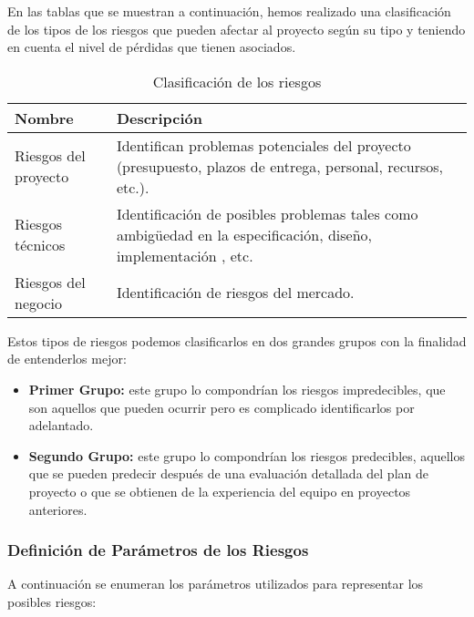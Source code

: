 \par En las tablas que se muestran a continuación, hemos realizado una clasificación de los tipos de los riesgos que pueden afectar al proyecto según su tipo y teniendo en cuenta el nivel de pérdidas que tienen asociados.

\begin{table}[H]
\begin{center}
\begin{tabular}{p{} p{11cm}}
\textbf{Nombre} & \textbf{Descripción}  \\ \hline
Riesgos del proyecto & Identifican problemas potenciales del proyecto (presupuesto, plazos de entrega, personal, recursos, etc.).\\
Riesgos técnicos &  Identificación de posibles problemas tales como ambigüedad en la especificación, diseño, implementación , etc.\\
Riesgos del negocio &  Identificación de riesgos del mercado. \\ \hline
\end{tabular}
\caption{Clasificación de los riesgos}
\label{clasificacionRiesgos}
\end{center}
\end{table}

\par Estos tipos de riesgos podemos clasificarlos en dos grandes grupos con la finalidad de entenderlos mejor:

\begin{itemize}[-]
  \item \textbf{Primer Grupo:} este grupo lo compondrían los riesgos impredecibles, que son aquellos que pueden ocurrir pero es complicado identificarlos por adelantado.
  \item \textbf{Segundo Grupo:} este grupo lo compondrían los riesgos predecibles, aquellos que se pueden predecir después de una evaluación detallada del plan de proyecto o que se obtienen de la experiencia del equipo en proyectos anteriores.
\end{itemize}

\subsubsection{Definición de Parámetros de los Riesgos}
\par A continuación se enumeran los parámetros utilizados para representar los posibles riesgos:

